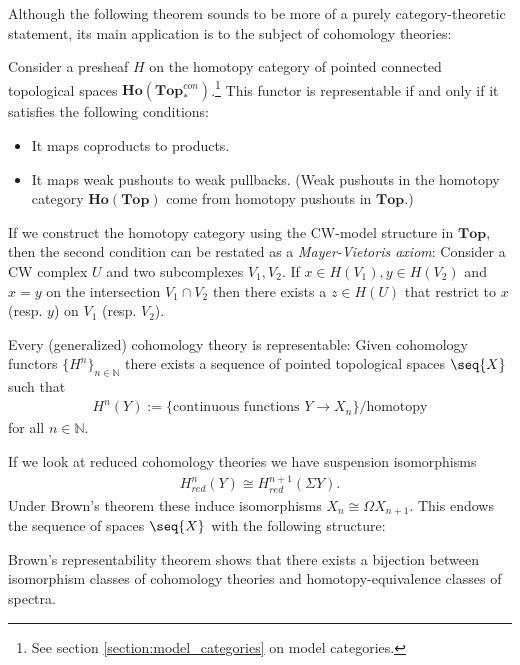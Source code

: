     Although the following theorem sounds to be more of a purely category-theoretic statement, its main application is to the subject of cohomology theories:
    \begin{theorem}\label{topology:brown}
        Consider a presheaf $H$ on the homotopy category of pointed connected topological spaces $\mathbf{Ho}(\mathbf{Top}^{con}_*)$.\footnote{See section \ref{section:model_categories} on model categories.} This functor is representable if and only if it satisfies the following conditions:
        \begin{itemize}
            \item It maps coproducts to products.
            \item It maps weak pushouts to weak pullbacks. (Weak pushouts in the homotopy category $\mathbf{Ho}(\mathbf{Top})$ come from homotopy pushouts in $\mathbf{Top}$.)
        \end{itemize}
    \end{theorem}
    \begin{remark}
        If we construct the homotopy category using the CW-model structure in $\mathbf{Top}$, then the second condition can be restated as a \textit{Mayer-Vietoris axiom}: Consider a CW complex $U$ and two subcomplexes $V_1, V_2$. If $x\in H(V_1), y\in H(V_2)$ and $x=y$ on the intersection $V_1\cap V_2$ then there exists a $z\in H(U)$ that restrict to $x$ (resp. $y$) on $V_1$ (resp. $V_2$).
    \end{remark}
    \begin{result}
        Every (generalized) cohomology theory is representable: Given cohomology functors $\{H^n\}_{n\in\mathbb{N}}$ there exists a sequence of pointed topological spaces $\seq{X}$ such that
        \begin{gather}
            H^n(Y) := \{\text{continuous functions } Y\rightarrow X_n\}/\text{homotopy}
        \end{gather}
        for all $n\in\mathbb{N}$.
    \end{result}

    If we look at reduced cohomology theories we have suspension isomorphisms
    \begin{gather}
        H^n_{red}(Y)\cong H^{n+1}_{red}(\Sigma Y).
    \end{gather}
    Under Brown's theorem these induce isomorphisms $X_n\cong\Omega X_{n+1}$. This endows the sequence of spaces $\seq{X}$ with the following structure:
    \begin{property}
        Brown's representability theorem shows that there exists a bijection between isomorphism classes of cohomology theories and homotopy-equivalence classes of spectra.
    \end{property}

